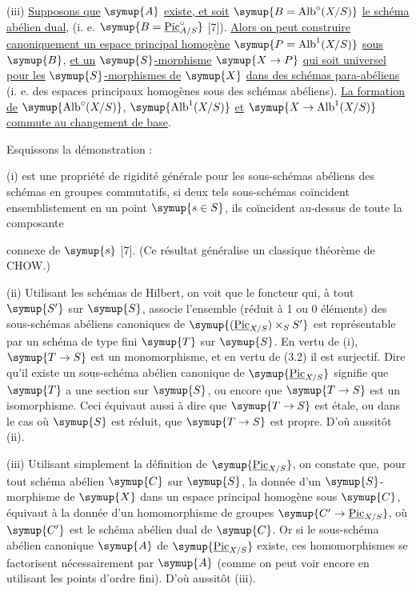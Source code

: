 \noindent(iii) \uline{Supposons que} $\symup{A}$ \uline{existe, et soit}
$\symup{B=\operatorname{Alb}^\circ(X/S)}$ \uline{le schéma abélien dual}, (i. e.
$\symup{B=\underline{\operatorname{Pic}}_{A/S}^\circ}$ [7]). \uline{Alors on peut construire
canoniquement un espace principal homogène} $\symup{P=\operatorname{Alb}^1(X/S)}$ \uline{sous}
$\symup{B}$, \uline{et un} $\symup{S}$\uline{-morphisme} $\symup{X\to P}$ \uline{qui soit universel pour les}
$\symup{S}$\uline{-morphismes de} $\symup{X}$ \uline{dans des schémas para-abéliens} (i. e. des espaces
principaux homogènes sous des schémas abéliens). \uline{La formation de}
$\symup{\operatorname{Alb}^\circ(X/S)}$, $\symup{\operatorname{Alb}^1(X/S)}$ \uline{et}
$\symup{X\to\operatorname{Alb}^1(X/S)}$ \uline{commute au changement de base}.

Esquissons la démonstration :

(i) est une propriété de rigidité générale pour les sous-schémas abéliens des
schémas en groupes commutatifs, si deux tels sous-schémas coïncident
ensemblistement en un point $\symup{s\in S}$, ils coïncident au-dessus de toute la
composante

connexe de $\symup{s}$ [7]. (Ce résultat généralise un classique théorème de CHOW.)

(ii) Utilisant les schémas de Hilbert, on voit que le foncteur qui, à tout
$\symup{S'}$ sur $\symup{S}$, associe l'ensemble (réduit à 1 ou 0 éléments) des sous-schémas
abéliens canoniques de $\symup{(\underline{\operatorname{Pic}}_{X/S})\times_S S'}$ est
représentable par un schéma de type fini $\symup{T}$ sur $\symup{S}$. En vertu de (i),
$\symup{T\to S}$ est un monomorphisme, et en vertu de (3.2) il est
surjectif. Dire qu'il existe un sous-schéma abélien canonique de
$\symup{\underline{\operatorname{Pic}}_{X/S}}$ signifie que $\symup{T}$ a une section sur $\symup{S}$, ou encore
que $\symup{T\to S}$ est un isomorphisme. Ceci équivaut aussi à dire que
$\symup{T\to S}$ est étale, ou dans le cas où $\symup{S}$ est réduit, que
$\symup{T\to S}$ est propre. D'où aussitôt (ii).

(iii) Utilisant simplement la définition de $\symup{\underline{\operatorname{Pic}}_{X/S}}$, on
constate que, pour tout schéma abélien $\symup{C}$ sur $\symup{S}$, la donnée d'un
$\symup{S}$-morphisme de $\symup{X}$ dans un espace principal homogène sous $\symup{C}$, équivaut à la
donnée d'un homomorphisme de groupes
$\symup{C'\to\underline{\operatorname{Pic}}_{X/S}}$, où $\symup{C'}$ est le schéma abélien
dual de $\symup{C}$. Or si le sous-schéma abélien canonique $\symup{A}$ de
$\symup{\underline{\operatorname{Pic}}_{X/S}}$ existe, ces homomorphismes se factorisent
nécessairement par $\symup{A}$ (comme on peut voir encore en utilisant les points
d'ordre fini). D'où aussitôt (iii).

